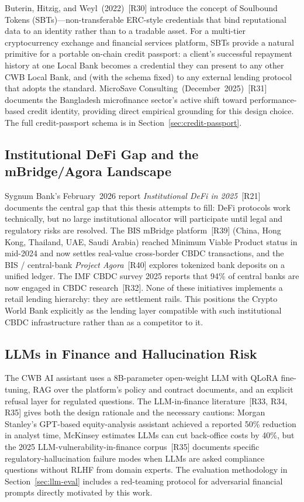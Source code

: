 \documentclass[12pt,a4paper]{report}
\begin{document}
Buterin, Hitzig, and Weyl~(2022)~[R30] introduce the concept of Soulbound Tokens (SBTs)---non-transferable ERC-style credentials that bind reputational data to an identity rather than to a tradable asset. For a multi-tier cryptocurrency exchange and financial services platform, SBTs provide a natural primitive for a portable on-chain credit passport: a client's successful repayment history at one Local Bank becomes a credential they can present to any other CWB Local Bank, and (with the schema fixed) to any external lending protocol that adopts the standard. MicroSave Consulting~(December~2025)~[R31] documents the Bangladesh microfinance sector's active shift toward performance-based credit identity, providing direct empirical grounding for this design choice. The full credit-passport schema is in Section~\ref{sec:credit-passport}.

\subsection{Institutional DeFi Gap and the mBridge/Agora Landscape}
\label{sec:lit-institutional}

Sygnum Bank's February~2026 report \textit{Institutional DeFi in 2025}~[R21] documents the central gap that this thesis attempts to fill: DeFi protocols work technically, but no large institutional allocator will participate until legal and regulatory risks are resolved. The BIS mBridge platform~[R39] (China, Hong Kong, Thailand, UAE, Saudi Arabia) reached Minimum Viable Product status in mid-2024 and now settles real-value cross-border CBDC transactions, and the BIS / central-bank \textit{Project Agora}~[R40] explores tokenized bank deposits on a unified ledger. The IMF CBDC survey 2025 reports that 94\% of central banks are now engaged in CBDC research~[R32]. None of these initiatives implements a retail lending hierarchy: they are settlement rails. This positions the Crypto World Bank explicitly as the lending layer compatible with such institutional CBDC infrastructure rather than as a competitor to it.

\subsection{LLMs in Finance and Hallucination Risk}
\label{sec:lit-llm}

The CWB AI assistant uses a 8B-parameter open-weight LLM with QLoRA fine-tuning, RAG over the platform's policy and contract documents, and an explicit refusal layer for regulated questions. The LLM-in-finance literature~[R33, R34, R35] gives both the design rationale and the necessary cautions: Morgan Stanley's GPT-based equity-analysis assistant achieved a reported 50\% reduction in analyst time, McKinsey estimates LLMs can cut back-office costs by 40\%, but the 2025 LLM-vulnerability-in-finance corpus~[R35] documents specific regulatory-hallucination failure modes when LLMs are asked compliance questions without RLHF from domain experts. The evaluation methodology in Section~\ref{sec:llm-eval} includes a red-teaming protocol for adversarial financial prompts directly motivated by this work.
\end{document}
